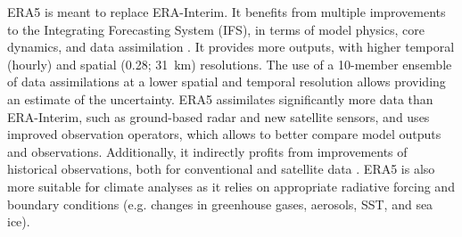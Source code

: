 \documentclass[alpha-refs]{wiley-article}
\begin{document}
ERA5 \citep{Hersbach2019} is meant to replace ERA-Interim. It benefits from multiple improvements to the Integrating Forecasting System (IFS), in terms of model physics, core dynamics, and data assimilation \citep{Hersbach2019}. It provides more outputs, with higher temporal (hourly) and spatial (0.28\degree; 31~km) resolutions. The use of a 10-member ensemble of data assimilations at a lower spatial and temporal resolution allows providing an estimate of the uncertainty. ERA5 assimilates significantly more data than ERA-Interim, such as ground-based radar and new satellite sensors, and uses improved observation operators, which allows to better compare model outputs and observations. Additionally, it indirectly profits from improvements of historical observations, both for conventional and satellite data \citep{Hersbach2019}. ERA5 is also more suitable for climate analyses as it relies on appropriate radiative forcing and boundary conditions (e.g. changes in greenhouse gases, aerosols, SST, and sea ice).
\end{document}
